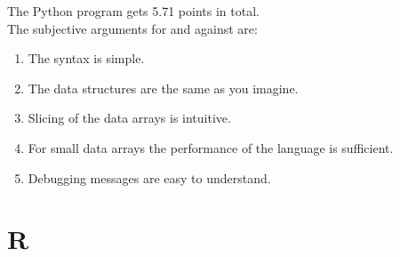 \documentclass [twoside,
  11pt, a4paper,
  footinclude=true,
  headinclude=true,
  cleardoublepage=empty
]{article}
\begin{document}
The Python program gets 5.71 points in total.\\
The subjective arguments for and against are: 
\begin{enumerate}
    \item The syntax is simple.
    \item The data structures are the same as you imagine.
    \item Slicing of the data arrays is intuitive.
    \item For small data arrays the performance of the language is sufficient.
    \item Debugging messages are easy to understand.
\end{enumerate}  

\newpage
\section{R}
\end{document}
